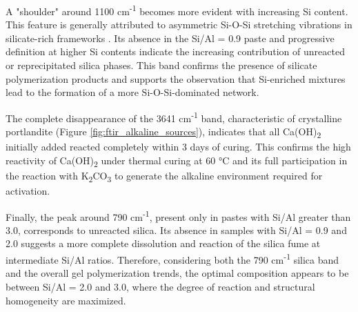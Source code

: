 A "shoulder" around 1100 cm\textsuperscript{-1} becomes more evident with increasing Si content.
This feature is generally attributed to asymmetric Si-O-Si stretching vibrations in silicate-rich frameworks \cite{ma2022calcium}.
Its absence in the Si/Al = 0.9 paste and progressive definition at higher Si contents indicate the increasing contribution of unreacted or reprecipitated silica phases.
This band confirms the presence of silicate polymerization products and supports the observation that Si-enriched mixtures lead to the formation of a more Si-O-Si-dominated network.

The complete disappearance of the 3641 cm\textsuperscript{-1} band, characteristic of crystalline portlandite (Figure \ref{fig:ftir_alkaline_sources}), indicates that all Ca(OH)\textsubscript{2} initially added reacted completely within 3 days of curing.
This confirms the high reactivity of Ca(OH)\textsubscript{2} under thermal curing at 60 °C and its full participation in the reaction with K\textsubscript{2}CO\textsubscript{3} to generate the alkaline environment required for activation.

Finally, the peak around 790 cm\textsuperscript{-1}, present only in pastes with Si/Al greater than 3.0, corresponds to unreacted silica.
Its absence in samples with Si/Al = 0.9 and 2.0 suggests a more complete dissolution and reaction of the silica fume at intermediate Si/Al ratios.
Therefore, considering both the 790 cm\textsuperscript{-1} silica band and the overall gel polymerization trends, the optimal composition appears to be between Si/Al = 2.0 and 3.0, where the degree of reaction and structural homogeneity are maximized.



